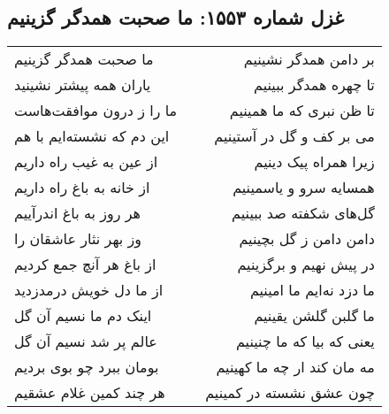 \begin{center}
\section*{غزل شماره ۱۵۵۳: ما صحبت همدگر گزینیم}
\label{sec:1553}
\begin{longtable}{l p{0.5cm} r}
ما صحبت همدگر گزینیم
&&
بر دامن همدگر نشینیم
\\
یاران همه پیشتر نشینید
&&
تا چهره همدگر ببینیم
\\
ما را ز درون موافقت‌هاست
&&
تا ظن نبری که ما همینیم
\\
این دم که نشسته‌ایم با هم
&&
می بر کف و گل در آستینیم
\\
از عین به غیب راه داریم
&&
زیرا همراه پیک دینیم
\\
از خانه به باغ راه داریم
&&
همسایه سرو و یاسمینیم
\\
هر روز به باغ اندرآییم
&&
گل‌های شکفته صد ببینیم
\\
وز بهر نثار عاشقان را
&&
دامن دامن ز گل بچینیم
\\
از باغ هر آنچ جمع کردیم
&&
در پیش نهیم و برگزینیم
\\
از ما دل خویش درمدزدید
&&
ما دزد نه‌ایم ما امینیم
\\
اینک دم ما نسیم آن گل
&&
ما گلبن گلشن یقینیم
\\
عالم پر شد نسیم آن گل
&&
یعنی که بیا که ما چنینیم
\\
بومان ببرد چو بوی بردیم
&&
مه مان کند ار چه ما کهینیم
\\
هر چند کمین غلام عشقیم
&&
چون عشق نشسته در کمینیم
\\
\end{longtable}
\end{center}
